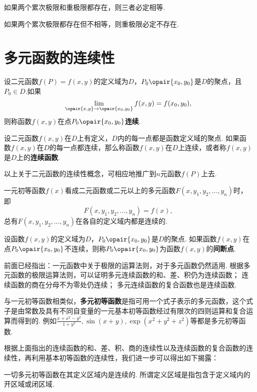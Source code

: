 \begin{corollary}
如果两个累次极限和重极限都存在，则三者必定相等.
\end{corollary}

\begin{corollary}
如果两个累次极限都存在但不相等，则重极限必定不存在.
\end{corollary}

\section{多元函数的连续性}
\begin{definition}
设二元函数\(f(P)=f(x,y)\)的定义域为\(D\)，\(P_0\opair{x_0,y_0}\)是\(D\)的聚点，且\(P_0 \in D\).如果\[
\lim\limits_{\opair{x,y}\to\opair{x_0,y_0}} f(x,y) = f(x_0,y_0),
\]则称函数\(f(x,y)\)在点\(P_0\opair{x_0,y_0}\)\textbf{连续}.

设二元函数\(f(x,y)\)在\(D\)上有定义，\(D\)内的每一点都是函数定义域的聚点.
如果函数\(f(x,y)\)在\(D\)的每一点都连续，那么称函数\(f(x,y)\)在\(D\)上连续，或者称\(f(x,y)\)是\(D\)上的\textbf{连续函数}.
\end{definition}
以上关于二元函数的连续性概念，可相应地推广到\(n\)元函数\(f(P)\)上去.

一元初等函数\(f(x)\)看成二元函数或二元以上的多元函数\(F(x,y_1,y_2,\dotsc,y_n)\)时，即\[
F(x,y_1,y_2,\dotsc,y_n) = f(x),
\]总有\(F(x,y_1,y_2,\dotsc,y_n)\)在各自的定义域内都是连续的.

\begin{definition}
设函数\(f(x,y)\)的定义域为\(D\)，\(P_0\opair{x_0,y_0}\)是\(D\)的聚点.
如果函数\(f(x,y)\)在点\(P_0\opair{x_0,y_0}\)不连续，则称\(P_0\opair{x_0,y_0}\)为函数\(f(x,y)\)的\textbf{间断点}.
\end{definition}

前面已经指出：一元函数中关于极限的运算法则，对于多元函数仍然适用.
根据多元函数的极限运算法则，可以证明多元连续函数的和、差、积仍为连续函数；
连续函数的商在分母不为零处仍连续；
多元连续函数的复合函数也是连续函数.

与一元初等函数相类似，\textbf{多元初等函数}是指可用一个式子表示的多元函数，这个式子是由常数及具有不同自变量的一元基本初等函数经过有限次的四则运算和复合运算而得到的.
例如\(\frac{x+x^2-y^2}{1+y^2},\sin(x+y),\exp(x^2+y^2+z^2)\)等都是多元初等函数.

根据上面指出的连续函数的和、差、积、商的连续性以及连续函数的复合函数的连续性，再利用基本初等函数的连续性，我们进一步可以得出如下揭露：

一切多元初等函数在其定义区域内是连续的.
所谓定义区域是指包含于定义域内的开区域或闭区域.


